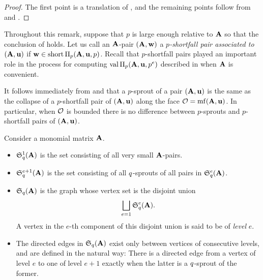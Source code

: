 \documentclass{article}
\begin{document}
\begin{proof} 
The first point is a translation of , and the remaining points follow from  and .
\end{proof}

\begin{remark}
   \label{sprouts as collapsed shortfall pairs: R}
   Throughout this remark, suppose that $p$ is large enough relative to $\mathbf{A}$ so that the conclusion of  holds.
   Let us call an $\mathbf{A}$-pair $(\mathbf{A},\mathbf{w})$ a \emph{$p$-shortfall pair associated to $(\mathbf{A},\mathbf{u})$} if $\mathbf{w} \in \operatorname{short} \Pi_p(\mathbf{A},\mathbf{u},p)$.   Recall that $p$-shortfall pairs played an important role in the process for computing $\operatorname{val} \Pi_p(\mathbf{A},\mathbf{u},p^e)$ described in  when $\mathbf{A}$ is convenient.

   It follows immediately from  and  that a $p$-sprout of a pair $(\mathbf{A},\mathbf{u})$ is the same as the collapse of a $p$-shortfall pair of $(\mathbf{A},\mathbf{u})$ along the face $\mathcal{O}=\operatorname{mf}(\mathbf{A},\mathbf{u})$.  In particular, when $\mathcal{O}$ is bounded there is no difference between $p$-sprouts and $p$-shortfall pairs of $(\mathbf{A},\mathbf{u})$.
\end{remark}

\begin{definition}
   Consider a monomial matrix $\mathbf{A}$.
   
   \begin{itemize}
   \item $\mathfrak{S}_{q}^1(\mathbf{A})$ is the set consisting of all very small $\mathbf{A}$-pairs.
   \item $\mathfrak{S}_{q}^{e+1}(\mathbf{A})$ is the set consisting of all $q$-sprouts of all pairs in $\mathfrak{S}_{q}^e(\mathbf{A})$.
   \item $\mathfrak{S}_{q}(\mathbf{A})$ is the graph whose vertex set is the disjoint union
   \[ \bigsqcup_{e=1} \mathfrak{S}_{q}^e(\mathbf{A}). \]
   A vertex in the $e$-th component of this disjoint union is said to be of \emph{level} $e$.
   \item    The directed edges in $\mathfrak{S}_{q}(\mathbf{A})$ exist only between vertices of consecutive levels, and are defined in the natural way:  There is a directed edge from a vertex of level $e$ to one of level $e+1$ exactly when the latter is a $q$-sprout of the former.
\end{itemize}
\end{definition}
\end{document}
